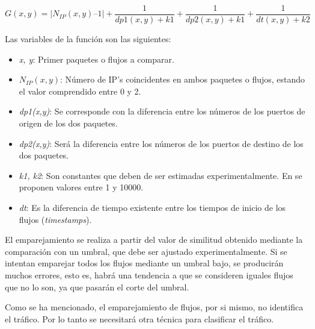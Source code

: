 \begin{equation}\label{ecug}
G(x,y) = |N_{IP}(x,y) – 1| + \frac{1}{dp1(x,y) + k1} + \frac{1}{dp2(x,y) + k1} + \frac{1}{dt(x,y) + k2}
\end{equation}

\intro Las variables de la función son las siguientes: 

\begin{itemize}
\item \textit{x, y}: Primer paquetes o flujos a comparar.
\item \textit{$N_{IP}(x,y)$}: Número de IP's coincidentes en ambos paquetes o flujos, estando el valor comprendido entre 0 y 2.
\item \textit{dp1(x,y)}: Se corresponde con la diferencia entre los números de los puertos de origen de los dos paquetes.
\item \textit{dp2(x,y)}: Será la diferencia entre los números de los puertos de destino de los dos paquetes.
\item \textit{k1, k2}: Son constantes que deben de ser estimadas experimentalmente. En \cite{comparacion} se proponen valores entre 1 
y 10000.
\item \textit{dt}: Es la diferencia de tiempo existente entre los tiempos de inicio de los flujos (\textit{timestamps}).
\end{itemize}

\intro El emparejamiento se realiza a partir del valor de similitud obtenido mediante la comparación con un umbral, que debe ser 
ajustado experimentalmente. Si se intentan emparejar todos los flujos mediante un umbral bajo, se producirán muchos errores, esto es, 
habrá una tendencia a que se consideren iguales flujos que no lo son, ya que pasarán el corte del umbral.

\intro Como se ha mencionado, el emparejamiento de flujos, por si mismo, no identifica el tráfico. Por lo tanto se 
necesitará otra técnica para clasificar el tráfico.
